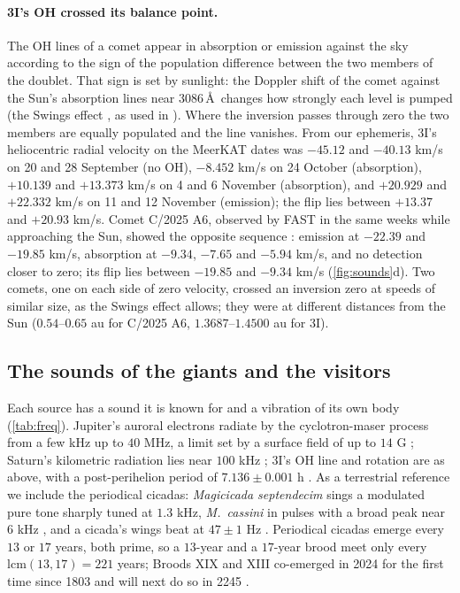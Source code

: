 \documentclass[11pt]{article}
\theoremstyle{definition}\newtheorem{definition}[theorem]{Definition}
\theoremstyle{remark}\newtheorem{remark}[theorem]{Remark}
\begin{document}
\paragraph{3I's OH crossed its balance point.} The OH lines of a comet appear in absorption or emission against the sky according to the sign of the population difference between the two members of the doublet. That sign is set by sunlight: the Doppler shift of the comet against the Sun's absorption lines near $3086$\,\AA\ changes how strongly each level is pumped (the Swings effect \cite{Despois,Schleicher}, as used in \cite{Jiang}). Where the inversion passes through zero the two members are equally populated and the line vanishes. From our ephemeris, 3I's heliocentric radial velocity on the MeerKAT dates was $-45.12$ and $-40.13$ km/s on 20 and 28 September (no OH), $-8.452$ km/s on 24 October (absorption), $+10.139$ and $+13.373$ km/s on 4 and 6 November (absorption), and $+20.929$ and $+22.332$ km/s on 11 and 12 November (emission); the flip lies between $+13.37$ and $+20.93$ km/s. Comet C/2025 A6, observed by FAST in the same weeks while approaching the Sun, showed the opposite sequence \cite{Jiang}: emission at $-22.39$ and $-19.85$ km/s, absorption at $-9.34$, $-7.65$ and $-5.94$ km/s, and no detection closer to zero; its flip lies between $-19.85$ and $-9.34$ km/s (\cref{fig:sounds}d). Two comets, one on each side of zero velocity, crossed an inversion zero at speeds of similar size, as the Swings effect allows; they were at different distances from the Sun ($0.54$--$0.65$ au for C/2025 A6, $1.3687$--$1.4500$ au for 3I).

\subsection{The sounds of the giants and the visitors}\label{sec:sounds}
Each source has a sound it is known for and a vibration of its own body (\cref{tab:freq}). Jupiter's auroral electrons radiate by the cyclotron-maser process from a few kHz up to $40$ MHz, a limit set by a surface field of up to $14$ G \cite{Louis,SKAWB}; Saturn's kilometric radiation lies near $100$ kHz \cite{SKAWB}; 3I's OH line and rotation are as above, with a post-perihelion period of $7.136\pm0.001$ h \cite{ScarmatoLoeb}. As a terrestrial reference we include the periodical cicadas: \emph{Magicicada septendecim} sings a modulated pure tone sharply tuned at $1.3$ kHz, \emph{M.~cassini} in pulses with a broad peak near $6$ kHz \cite{YoungJosephson}, and a cicada's wings beat at $47\pm1$ Hz \cite{Wan}. Periodical cicadas emerge every $13$ or $17$ years, both prime, so a $13$-year and a $17$-year brood meet only every $\mathrm{lcm}(13,17)=221$ years; Broods XIX and XIII co-emerged in 2024 for the first time since 1803 and will next do so in 2245 \cite{BroodXIX}.
\end{document}

